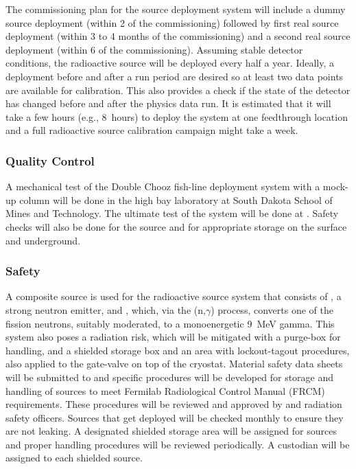 The commissioning plan for the source deployment system will include a dummy source deployment (within \num{2} of the commissioning) followed by first real source deployment (within \num{3} to \num{4} months of the commissioning) and a second real source deployment (within \num{6} of the commissioning). Assuming stable detector conditions, the radioactive source will be deployed every half a year. Ideally, a deployment before and after a run period are desired so at least two data points are available for calibration. This also provides a check if the state of the detector
has changed before and after the physics data run.
It is estimated that it will take a few hours (e.g., \num{8}~hours) to deploy the system at one feedthrough location and a full radioactive source calibration campaign might take %
a week.

\subsubsection{Quality Control}
A mechanical test of the Double Chooz fish-line deployment system with a  mock-up column will be done in the high bay laboratory at South Dakota School of Mines and Technology. The ultimate test of the system will be done at . Safety checks will also be done for the source and for appropriate storage on the surface and underground. 

\subsubsection{Safety}
\label{sec:dp-calib-rsds-safety}
A composite source is used for the radioactive source system that consists  of , a strong neutron emitter, and , which, via the (n,$\gamma$) process, converts one of the  fission neutrons, suitably moderated, to a monoenergetic \SI{9}{\MeV} gamma. This system also poses a radiation risk, which will be mitigated with a purge-box for handling, and a shielded storage box and an area with lockout-tagout procedures, also applied to the gate-valve on top of the cryostat. Material safety data sheets will be submitted to   and specific procedures will be developed for storage and handling of sources to meet Fermilab Radiological Control Manual (FRCM) requirements. These procedures will be reviewed and approved by  and \fnal radiation safety officers. Sources that get deployed will be checked monthly to ensure they are not leaking. A designated shielded storage area will be assigned for sources and proper handling procedures will be reviewed periodically. A custodian will be assigned to each shielded source.